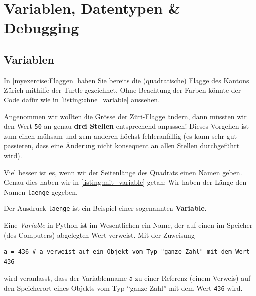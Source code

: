 \chapter{Variablen, Datentypen \& Debugging}\label{ch:K03_Variables_Debugging}

\section{Variablen}
\begin{myexample}\label{myexample:ersteVariable}
In \cref{myexercise:Flaggen} haben Sie bereits die (quadratische) Flagge des Kantons Zürich mithilfe der Turtle gezeichnet. Ohne Beachtung der Farben könnte der Code dafür wie in \cref{listing:ohne_variable} aussehen.



Angenommen wir wollten die Grösse der Züri-Flagge ändern, dann müssten wir den Wert \lstinline|50| an genau \textbf{drei Stellen} entsprechend anpassen! Dieses Vorgehen ist zum einen mühsam und zum anderen höchst fehleranfällig (es kann sehr gut passieren, dass eine Änderung nicht konsequent an allen Stellen durchgeführt wird).

Viel besser ist es, wenn wir der Seitenlänge des Quadrats einen Namen geben. Genau dies haben wir in \cref{listing:mit_variable} getan: Wir haben der Länge den Namen \lstinline|laenge| gegeben.

Der Ausdruck \lstinline|laenge| ist ein Beispiel einer sogenannten \textbf{Variable}.
\end{myexample}

\begin{mydefinition}
Eine \emph{Variable} in Python ist im Wesentlichen ein Name, der auf einen im Speicher (des Computers) abgelegten Wert verweist. Mit der Zuweisung
\begin{lstlisting}[numbers=none]
	a = 436 # a verweist auf ein Objekt vom Typ "ganze Zahl" mit dem Wert 436
\end{lstlisting}
wird veranlasst, dass der Variablenname \lstinline|a| zu einer Referenz (einem Verweis) auf den Speicherort eines Objekts vom Typ \enquote{ganze Zahl} mit dem Wert \lstinline|436| wird.
\end{mydefinition}

